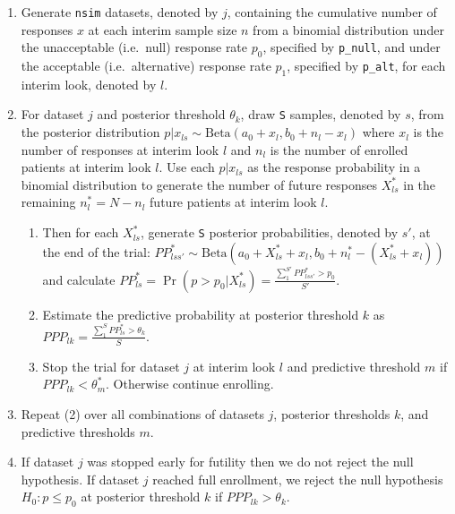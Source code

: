 \begin{enumerate}
\def\labelenumi{\arabic{enumi}.}
\item
  Generate \texttt{nsim} datasets, denoted by \(j\), containing the cumulative number of responses \(x\) at each interim sample size \(n\) from a binomial distribution under the unacceptable (i.e.~null) response rate \(p_0\), specified by \texttt{p\_null}, and under the acceptable (i.e.~alternative) response rate \(p_1\), specified by \texttt{p\_alt}, for each interim look, denoted by \(l\).
\item
  For dataset \(j\) and posterior threshold \(\theta_k\), draw \texttt{S} samples, denoted by \(s\), from the posterior distribution \(p|x_{ls} \sim \mbox{Beta}(a_0 + x_l, b_0 + n_l - x_l)\) where \(x_l\) is the number of responses at interim look \(l\) and \(n_l\) is the number of enrolled patients at interim look \(l\). Use each \(p|x_{ls}\) as the response probability in a binomial distribution to generate the number of future responses \(X^*_{ls}\) in the remaining \(n^*_l=N-n_l\) future patients at interim look \(l\).

  \begin{enumerate}
  \def\labelenumii{\alph{enumii}.}
  \tightlist
  \item
    Then for each \(X^*_{ls}\), generate \texttt{S} posterior probabilities, denoted by \(s'\), at the end of the trial: \(PP^*_{lss'} \sim \mbox{Beta}(a_0 + X^*_{ls} + x_l, b_0 + n^*_l - (X^*_{ls} + x_l))\) and calculate \(PP^*_{ls} = \Pr(p>p_0 | X^*_{ls}) = \frac{\sum_1^{S'} PP^*_{lss'} > p_0}{S'}\).
  \item
    Estimate the predictive probability at posterior threshold \(k\) as \(PPP_{lk} = \frac{\sum_1^S PP^*_{ls}>\theta_k}{S}\).
  \item
    Stop the trial for dataset \(j\) at interim look \(l\) and predictive threshold \(m\) if \(PPP_{lk} < \theta^*_m\). Otherwise continue enrolling.
  \end{enumerate}
\item
  Repeat (2) over all combinations of datasets \(j\), posterior thresholds \(k\), and predictive thresholds \(m\).
\item
  If dataset \(j\) was stopped early for futility then we do not reject the null hypothesis. If dataset \(j\) reached full enrollment, we reject the null hypothesis \(H_0: p \leq p_0\) at posterior threshold \(k\) if \(PPP_{lk} > \theta_k\).
\end{enumerate}

